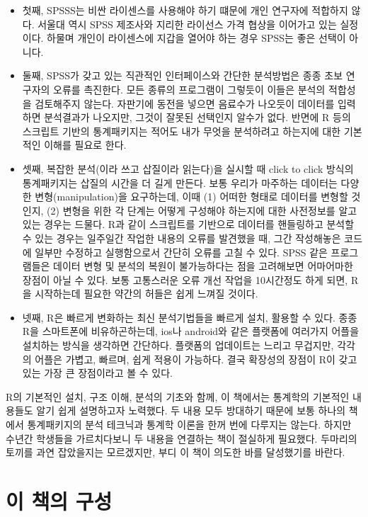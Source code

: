 \documentclass[
]{book}
\begin{document}
\begin{itemize}
\item
  첫째, SPSSS는 비싼 라이센스를 사용해야 하기 떄문에 개인 연구자에 적합하지 않다. 서울대 역시 SPSS 제조사와 지리한 라이선스 가격 협상을 이어가고 있는 실정이다. 하물며 개인이 라이센스에 지갑을 열어야 하는 경우 SPSS는 좋은 선택이 아니다.
\item
  둘째, SPSS가 갖고 있는 직관적인 인터페이스와 간단한 분석방법은 종종 초보 연구자의 오류를 촉진한다. 모든 종류의 프로그램이 그렇듯이 이들은 분석의 적합성을 검토해주지 않는다. 자판기에 동전을 넣으면 음료수가 나오듯이 데이터를 입력하면 분석결과가 나오지만, 그것이 잘못된 선택인지 알수가 없다. 반면에 R 등의 스크립트 기반의 통계패키지는 적어도 내가 무엇을 분석하려고 하는지에 대한 기본적인 이해를 필요로 한다.
\item
  셋째, 복잡한 분석(이라 쓰고 삽질이라 읽는다)을 실시할 때 click to click 방식의 통계패키지는 삽질의 시간을 더 길게 만든다. 보통 우리가 마주하는 데이터는 다양한 변형(manipulation)을 요구하는데, 이때 (1) 어떠한 형태로 데이터를 변형할 것인지, (2) 변형을 위한 각 단계는 어떻게 구성해야 하는지에 대한 사전정보를 알고 있는 경우는 드물다. R과 같이 스크립트를 기반으로 데이터를 핸들링하고 분석할 수 있는 경우는 일주일간 작업한 내용의 오류를 발견했을 때, 그간 작성해놓은 코드에 일부만 수정하고 실행함으로서 간단히 오류를 고칠 수 있다. SPSS 같은 프로그램들은 데이터 변형 및 분석의 복원이 불가능하다는 점을 고려해보면 어마어마한 장점이 아닐 수 있다. 보통 고통스러운 오류 개선 작업을 10시간정도 하게 되면, R을 시작하는데 필요한 약간의 허들은 쉽게 느껴질 것이다.
\item
  넷째, R은 빠르게 변화하는 최신 분석기법들을 빠르게 설치, 활용할 수 있다. 종종 R을 스마트폰에 비유하곤하는데, ios나 android와 같은 플랫폼에 여러가지 어플을 설치하는 방식을 생각하면 간단하다. 플랫폼의 업데이트는 느리고 무겁지만, 각각의 어플은 가볍고, 빠르며, 쉽게 적용이 가능하다. 결국 확장성의 장점이 R이 갖고 있는 가장 큰 장점이라고 볼 수 있다.
\end{itemize}

R의 기본적인 설치, 구조 이해, 분석의 기초와 함께, 이 책에서는 통계학의 기본적인 내용들도 알기 쉽게 설명하고자 노력했다. 두 내용 모두 방대하기 때문에 보통 하나의 책에서 통계패키지의 분석 테크닉과 통계학 이론을 한꺼 번에 다루지는 않는다. 하지만 수년간 학생들을 가르치다보니 두 내용을 연결하는 책이 절실하게 필요했다. 두마리의 토끼를 과연 잡았을지는 모르겠지만, 부디 이 책이 의도한 바를 달성했기를 바란다.

\section{이 책의 구성}\label{uxc774-uxcc45uxc758-uxad6cuxc131}
\end{document}

